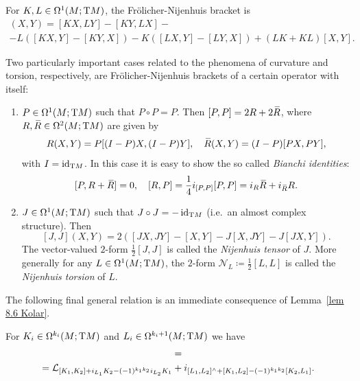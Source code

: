 \begin{lem}
    For $K,L\in\Omega^1(M;\mathrm{T} M)$, the Fr\"olicher-Nijenhuis bracket is 
    \begin{multline}
        [K,L](X,Y)=[KX,LY]-[KY,LX]-\\-L([KX,Y]-[KY,X])-K([LX,Y]-[LY,X])+(LK+KL)[X,Y].
    \end{multline}
\end{lem}

\begin{rem}\label{ex frolicher curvature and torsion}
    Two particularly important cases related to the phenomena of curvature and torsion, respectively, are  Fr\"olicher-Nijenhuis brackets of a certain operator with itself:
    \begin{enumerate}
        \item $P\in\Omega^1(M;\mathrm{T} M)$ such that $P\circ P=P$. Then $[P,P]=2R+2\wb{R}$, where $R,\wb{R}\in\Omega^2(M;\T M)$ are given by 
        \[R(X,Y)=P[(I-P)X,(I-P)Y],\quad \wb{R}(X,Y)=(I-P)[PX,PY],\]
        with $I=\operatorname{id}_{\mathrm{T} M}$. In this case it is easy to show the so called \emph{Bianchi identities}: 
        \[[P,R+\wb{R}]=0,\quad [R,P]=\frac14i_{[P,P]}[P,P]=i_R \wb{R}+i_{\wb{R}}R.\]
        \item $J\in\Omega^1(M;\mathrm{T} M)$ such that $J\circ J=-\operatorname{id}_{\mathrm{T} M}$ (i.e.~an almost complex structure). Then 
        \[[J,J](X,Y)=2([JX,JY]-[X,Y]-J[X,JY]-J[JX,Y]).\]
        The vector-valued $2$-form $\frac{1}{2}[J,J]$ is called the \emph{Nijenhuis tensor} of $J$. More generally for any $L\in \Omega^1(M;\mathrm{T} M)$, the $2$-form $\mathcal{N}_L\coloneqq \frac12[L,L]$ is called the \emph{Nijenhuis torsion} of $L$.
    \end{enumerate}
\end{rem}


The following final general relation is an immediate consequence of Lemma~\ref{lem 8.6 Kolar}.

\begin{thm}
    For $K_i\in\Omega^{k_i}(M;\mathrm{T} M)$ and $L_i\in\Omega^{k_i+1}(M;\mathrm{T} M)$ we have 
    \begin{multline}
        [\Lie_{K_1}+i_{L_1},\Lie_{K_2}+i_{L_2}]=\\
        =\Lie_{[K_1,K_2]+i_{L_1}K_2-(-1)^{k_1k_2}i_{L_2}K_1}+
        i_{[L_1,L_2]^{\wedge}+[K_1,L_2]-(-1)^{k_1k_2}[K_2,L_1]}.
    \end{multline}
\end{thm}

